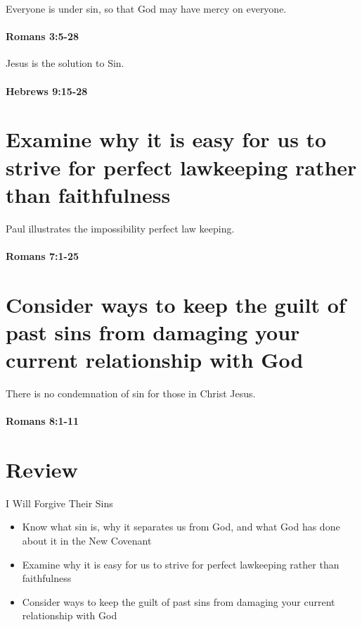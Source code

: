 \begin{frame}{Everyone is under sin, so that God may have mercy on everyone.}
\framesubtitle{Romans 3:5-28}

\end{frame}

\begin{frame}{Jesus is the solution to Sin.}
\framesubtitle{Hebrews 9:15-28}

\end{frame}

\section{Examine why it is easy for us to strive for perfect lawkeeping rather than faithfulness}

\begin{frame}{Paul illustrates the impossibility perfect law keeping.}
\framesubtitle{Romans 7:1-25}

\end{frame}

\section{Consider ways to keep the guilt of past sins from damaging your current relationship with God}

\begin{frame}{There is no condemnation of sin for those in Christ Jesus.}
\framesubtitle{Romans 8:1-11}

\end{frame}

\section{Review}

\begin{frame}{I Will Forgive Their Sins}
	\begin{itemize}
		\item Know what sin is, why it separates us from God, and what God has done about it in the New Covenant
		\item Examine why it is easy for us to strive for perfect lawkeeping rather than faithfulness
		\item Consider ways to keep the guilt of past sins from damaging your current relationship with God
	\end{itemize}
	
\end{frame}
